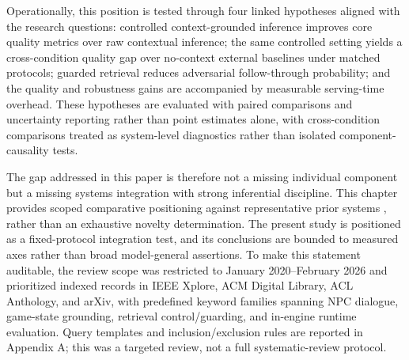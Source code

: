 ﻿\documentclass[a4paper,12pt]{article}
\begin{document}
Operationally, this position is tested through four linked hypotheses aligned with the research questions: controlled context-grounded inference improves core quality metrics over raw contextual inference; the same controlled setting yields a cross-condition quality gap over no-context external baselines under matched protocols; guarded retrieval reduces adversarial follow-through probability; and the quality and robustness gains are accompanied by measurable serving-time overhead. These hypotheses are evaluated with paired comparisons and uncertainty reporting rather than point estimates alone, with cross-condition comparisons treated as system-level diagnostics rather than isolated component-causality tests.

The gap addressed in this paper is therefore not a missing individual component but a missing systems integration with strong inferential discipline. This chapter provides scoped comparative positioning against representative prior systems \cite{Gallotta2024Survey,Sweetser2024Scoping,Rao2024Minecraft}, rather than an exhaustive novelty determination. The present study is positioned as a fixed-protocol integration test, and its conclusions are bounded to measured axes rather than broad model-general assertions.
To make this statement auditable, the review scope was restricted to January 2020--February 2026 and prioritized indexed records in IEEE Xplore, ACM Digital Library, ACL Anthology, and arXiv, with predefined keyword families spanning NPC dialogue, game-state grounding, retrieval control/guarding, and in-engine runtime evaluation. Query templates and inclusion/exclusion rules are reported in Appendix A; this was a targeted review, not a full systematic-review protocol.
\end{document}
